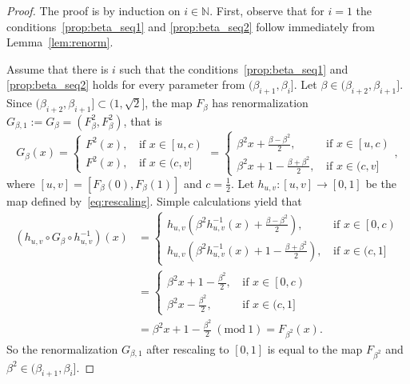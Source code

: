 \documentclass[10pt,a4paper]{amsart}
\newcommand{\Mod}[1]{\ (\mathrm{mod}\ #1)}
\begin{document}
\begin{proof}
The proof is by induction on $i\in\mathbb{N}$. First, observe that for $i=1$ the conditions~\eqref{prop:beta_seq1} and \eqref{prop:beta_seq2} follow immediately from Lemma~\ref{lem:renorm}.

Assume that there is $i$ such that the conditions~\eqref{prop:beta_seq1} and \eqref{prop:beta_seq2} holds for every parameter from $(\beta_{i+1},\beta_i]$. Let $\beta\in(\beta_{i+2},\beta_{i+1}]$. Since $(\beta_{i+2},\beta_{i+1}]\subset(1,\sqrt{2}]$, the map $F_{\beta}$ has renormalization $G_{\beta,1}:=G_{\beta}=(F^2_{\beta},F^2_{\beta})$, that is
$$
G_{\beta}(x)=
\begin{cases}F^2 (x),\,&\text{if 
		$x\in\left[u,c\right)$}\\
	F^2 (x),\,&\text{if $x\in (c,v]$}\end{cases}
=
\begin{cases}\beta^2x+\frac{\beta-\beta^2}{2},\,&\text{if 
		$x\in\left[u,c\right)$}\\
	\beta^2x+1-\frac{\beta+\beta^2}{2},\,&\text{if $x\in (c,v]$}\end{cases},
$$
where $[u,v]=[F_{\beta}(0),F_{\beta}(1)]$ and $c=\frac{1}{2}$. Let $h_{u,v}\colon[u,v]\to[0,1]$ be the map defined by~\eqref{eq:rescaling}. Simple calculations yield that 
$$
\begin{aligned}
\left(h_{u,v}\circ G_{\beta}\circ h^{-1}_{u,v}\right)(x)&=
\begin{cases}h_{u,v}\left(\beta^2h_{u,v}^{-1}(x)+\frac{\beta-\beta^2}{2}\right),\,&\text{if 
		$x\in\left[0,c\right)$}\\
	h_{u,v}\left(\beta^2h_{u,v}^{-1}(x)+1-\frac{\beta+\beta^2}{2}\right),\,&\text{if $x\in (c,1]$}\end{cases}\\
    &=
\begin{cases}\beta^2x+1-\frac{\beta^2}{2},\,&\text{if 
		$x\in\left[0,c\right)$}\\
	\beta^2x-\frac{\beta^2}{2},\,&\text{if $x\in (c,1]$}\end{cases}\\
    &=\beta^2 x+1-\frac{\beta^2}{2}\Mod{1}=F_{\beta^2}(x).
\end{aligned}
$$
So the renormalization $G_{\beta,1}$ after rescaling to $[0,1]$ is equal to the map $F_{\beta^2}$ and $\beta^2\in(\beta_{i+1},\beta_i]$.


\end{proof}
\end{document}
